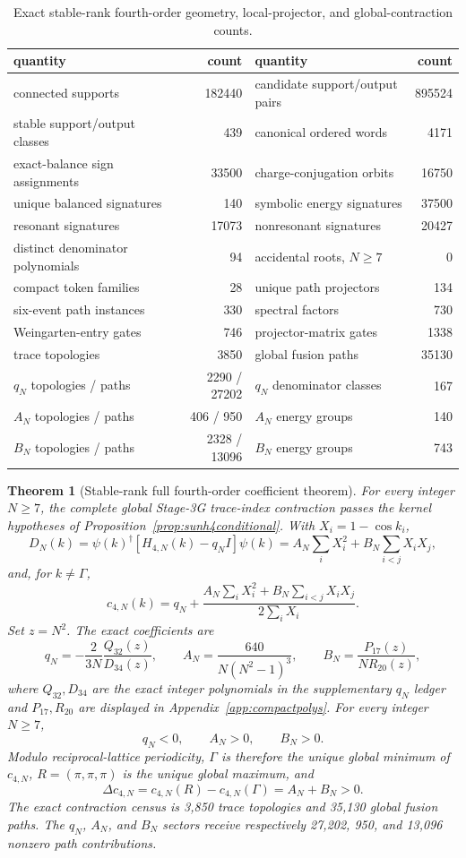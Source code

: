 \documentclass[11pt]{article}
\newtheorem{theorem}{Theorem}[section]
\begin{document}
\begin{table}[t]
\centering
\small
\begin{tabular}{lr@{\qquad}lr}
\toprule
quantity & count & quantity & count \\
\midrule
connected supports & 182440 & candidate support/output pairs & 895524 \\
stable support/output classes & 439 & canonical ordered words & 4171 \\
exact-balance sign assignments & 33500 & charge-conjugation orbits & 16750 \\
unique balanced signatures & 140 & symbolic energy signatures & 37500 \\
resonant signatures & 17073 & nonresonant signatures & 20427 \\
distinct denominator polynomials & 94 & accidental roots, $N\geq7$ & 0 \\
compact token families & 28 & unique path projectors & 134 \\
six-event path instances & 330 & spectral factors & 730 \\
Weingarten-entry gates & 746 & projector-matrix gates & 1338 \\
trace topologies & 3850 & global fusion paths & 35130 \\
$q_N$ topologies / paths & 2290 / 27202 & $q_N$ denominator classes & 167 \\
$A_N$ topologies / paths & 406 / 950 & $A_N$ energy groups & 140 \\
$B_N$ topologies / paths & 2328 / 13096 & $B_N$ energy groups & 743 \\
\bottomrule
\end{tabular}
\caption{Exact stable-rank fourth-order geometry, local-projector, and global-contraction counts.}
\label{tab:sunstable}
\end{table}

\begin{theorem}[Stable-rank full fourth-order coefficient theorem]
\label{thm:sunfull}
For every integer $N\geq7$, the complete global Stage-3G trace-index
contraction passes the kernel hypotheses of
Proposition~\ref{prop:sunh4conditional}. With $X_i=1-\cos k_i$,
\[
D_N(k)=\psi(k)^\dagger[H_{4,N}(k)-q_NI]\psi(k)
=A_N\sum_iX_i^2+B_N\sum_{i<j}X_iX_j,
\]
and, for $k\ne\Gamma$,
\[
c_{4,N}(k)=q_N+
\frac{A_N\sum_iX_i^2+B_N\sum_{i<j}X_iX_j}
{2\sum_iX_i}.
\]
Set $z=N^2$. The exact coefficients are
\[
q_N=-\frac{2}{3N}\frac{Q_{32}(z)}{D_{34}(z)},
\qquad
A_N=\frac{640}{N(N^2-1)^3},
\qquad
B_N=\frac{P_{17}(z)}{N R_{20}(z)},
\]
where $Q_{32},D_{34}$ are the exact integer polynomials in the supplementary
$q_N$ ledger and $P_{17},R_{20}$ are displayed in
Appendix~\ref{app:compactpolys}. For every integer $N\geq7$,
\[
q_N<0,\qquad A_N>0,\qquad B_N>0.
\]
Modulo reciprocal-lattice periodicity, $\Gamma$ is therefore the unique
global minimum of $c_{4,N}$, $R=(\pi,\pi,\pi)$ is the unique global maximum,
and
\[
\boxed{\Delta c_{4,N}=c_{4,N}(R)-c_{4,N}(\Gamma)=A_N+B_N>0.}
\]
The exact contraction census is 3,850 trace topologies and 35,130 global
fusion paths. The $q_N$, $A_N$, and $B_N$ sectors receive respectively
27,202, 950, and 13,096 nonzero path contributions.
\end{theorem}
\end{document}

